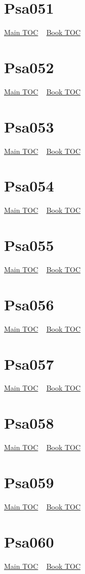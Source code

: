 \documentclass{book}
\begin{document}
  \section{Psa051}\hyperlink{toc}{Main TOC} ~ \hyperref[subsec:Psa]{Book TOC} 
  \section{Psa052}\hyperlink{toc}{Main TOC} ~ \hyperref[subsec:Psa]{Book TOC} 
  \section{Psa053}\hyperlink{toc}{Main TOC} ~ \hyperref[subsec:Psa]{Book TOC} 
  \section{Psa054}\hyperlink{toc}{Main TOC} ~ \hyperref[subsec:Psa]{Book TOC} 
  \section{Psa055}\hyperlink{toc}{Main TOC} ~ \hyperref[subsec:Psa]{Book TOC} 
  \section{Psa056}\hyperlink{toc}{Main TOC} ~ \hyperref[subsec:Psa]{Book TOC} 
  \section{Psa057}\hyperlink{toc}{Main TOC} ~ \hyperref[subsec:Psa]{Book TOC} 
  \section{Psa058}\hyperlink{toc}{Main TOC} ~ \hyperref[subsec:Psa]{Book TOC} 
  \section{Psa059}\hyperlink{toc}{Main TOC} ~ \hyperref[subsec:Psa]{Book TOC} 
  \section{Psa060}\hyperlink{toc}{Main TOC} ~ \hyperref[subsec:Psa]{Book TOC} 
\end{document}
